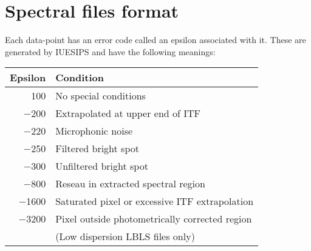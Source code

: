 \documentclass[11pt,nolof,noabs]{starlink}
\begin{document}
\section{Spectral files format}

Each data-point has an error code called an epsilon associated with it.
These are generated by  IUESIPS and have the following meanings:

\begin{center}
\begin{tabular}{|rl|} \hline
Epsilon& Condition\\ \hline
100&No special conditions\\
$-$200&Extrapolated at upper end of ITF\\
$-$220&Microphonic noise\\
$-$250&Filtered bright spot\\
$-$300&Unfiltered bright spot\\
$-$800&Reseau in extracted spectral region\\
$-$1600&Saturated pixel or excessive ITF extrapolation\\
$-$3200&Pixel outside photometrically corrected region\\
&(Low dispersion LBLS files only) \\ \hline
\end{tabular}
\end{center}
\end{document}
